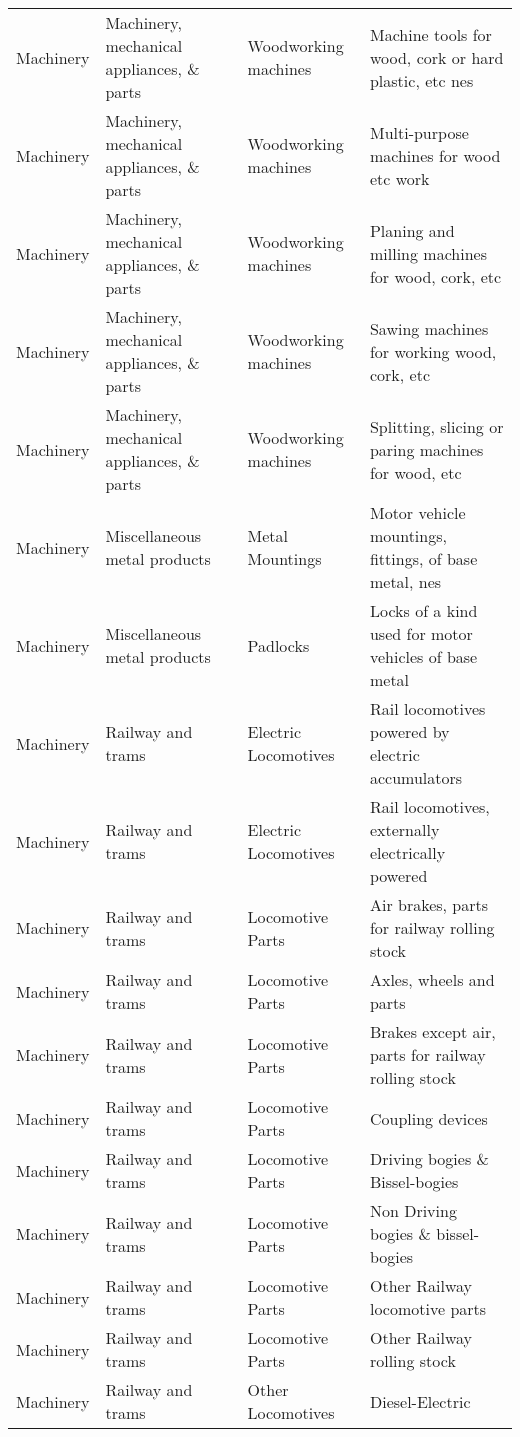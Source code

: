 \begin{appendices}
\begin{xltabular}{\textwidth}{|p{0.07\textwidth}|p{0.25\textwidth}|p{0.28\textwidth}|p{0.3\textwidth}|}
		Machinery & Machinery, mechanical appliances, \& parts & Woodworking machines & Machine tools for wood, cork or hard plastic, etc nes \\
		Machinery & Machinery, mechanical appliances, \& parts & Woodworking machines & Multi-purpose machines for wood etc work \\
		Machinery & Machinery, mechanical appliances, \& parts & Woodworking machines & Planing and milling machines for wood, cork, etc \\
		Machinery & Machinery, mechanical appliances, \& parts & Woodworking machines & Sawing machines for working wood, cork, etc \\
		Machinery & Machinery, mechanical appliances, \& parts & Woodworking machines & Splitting, slicing or paring machines for wood, etc \\
		Machinery & Miscellaneous metal products & Metal Mountings & Motor vehicle mountings, fittings, of base metal, nes \\
		Machinery & Miscellaneous metal products & Padlocks & Locks of a kind used for motor vehicles of base metal \\
		Machinery & Railway and trams & Electric Locomotives & Rail locomotives powered by electric accumulators \\
		Machinery & Railway and trams & Electric Locomotives & Rail locomotives, externally electrically powered \\
		Machinery & Railway and trams & Locomotive Parts & Air brakes, parts for railway rolling stock \\
		Machinery & Railway and trams & Locomotive Parts & Axles, wheels and parts \\
		Machinery & Railway and trams & Locomotive Parts & Brakes except air, parts for railway rolling stock \\
		Machinery & Railway and trams & Locomotive Parts & Coupling devices \\
		Machinery & Railway and trams & Locomotive Parts & Driving bogies  \& Bissel-bogies \\
		Machinery & Railway and trams & Locomotive Parts & Non Driving bogies \& bissel-bogies \\
		Machinery & Railway and trams & Locomotive Parts & Other Railway locomotive parts \\
		Machinery & Railway and trams & Locomotive Parts & Other Railway rolling stock  \\
		Machinery & Railway and trams & Other Locomotives & Diesel-Electric \\

\end{xltabular}
\end{appendices}
